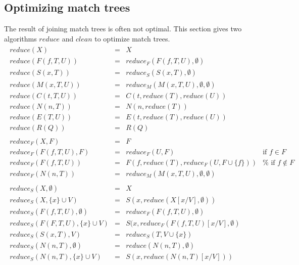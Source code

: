 \documentclass{article}
\begin{document}
\subsection{Optimizing match trees}

The result of joining match trees is often not optimal. This section gives
two algorithms $reduce$ and $clean$ to optimize match trees.%
\begin{equation*}
\begin{array}{l}
\begin{array}{llll}
reduce(X) & = & X &  \\ 
reduce(F(f,T,U)) & = & reduce_{F}(F(f,T,U),\emptyset ) &  \\ 
reduce(S(x,T)) & = & reduce_{S}(S(x,T),\emptyset ) &  \\ 
reduce(M(x,T,U)) & = & reduce_{M}(M(x,T,U),\emptyset ,\emptyset ) &  \\ 
reduce(C(t,T,U)) & = & C(t,reduce(T),reduce(U)) &  \\ 
reduce(N(n,T)) & = & N(n,reduce(T)) &  \\ 
reduce(E(T,U)) & = & E(t,reduce(T),reduce(U)) &  \\ 
reduce(R(Q)) & = & R(Q) &  \\ 
&  &  &  \\ 
reduce_{F}(X,F) & = & F &  \\ 
reduce_{F}(F(f,T,U),F) & = & reduce_{F}(U,F) & \text{if }f\in F \\ 
reduce_{F}(F(f,T,U)) & = & F(f,reduce(T),reduce_{F}(U,F\cup \{f\})) & \text{%
if }f\notin F \\ 
reduce_{F}(N(n,T)) & = & reduce_{M}(M(x,T,U),\emptyset ,\emptyset ) &  \\ 
&  &  &  \\ 
reduce_{S}(X,\emptyset ) & = & X &  \\ 
reduce_{S}(X,\{x\}\cup V) & = & S(x,reduce(X[x/V],\emptyset )) &  \\ 
reduce_{S}(F(f,T,U),\emptyset ) & = & reduce_{F}(F(f,T,U),\emptyset ) &  \\ 
reduce_{S}(F(F,T,U),\{x\}\cup V) & = & S(x,reduce_{F}(F(f,T,U)[x/V],%
\emptyset ) &  \\ 
reduce_{S}(S(x,T),V) & = & reduce_{S}(T,V\cup \{x\}) &  \\ 
reduce_{S}(N(n,T),\emptyset ) & = & reduce(N(n,T),\emptyset ) &  \\ 
reduce_{S}(N(n,T),\{x\}\cup V) & = & S(x,reduce(N(n,T)[x/V])) &  \\ 
&  &  &  \\ 

\end{array}
\end{array}
\end{equation*}
\end{document}
